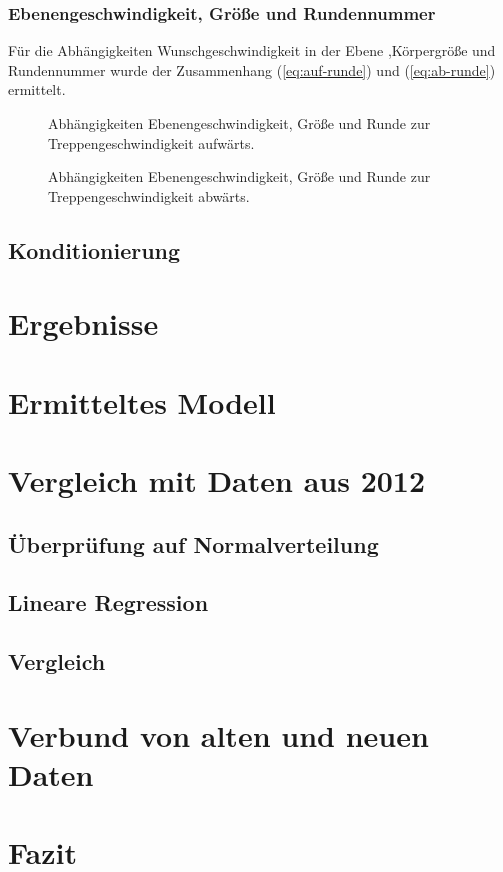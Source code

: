 \subsubsection{Ebenengeschwindigkeit, Größe und Rundennummer}

Für die Abhängigkeiten Wunschgeschwindigkeit in der Ebene ,Körpergröße und Rundennummer wurde 
der Zusammenhang (\ref{eq:auf-runde}) und (\ref{eq:ab-runde}) ermittelt.

\begin{figure} \centering 
	
	\caption{Abhängigkeiten Ebenengeschwindigkeit, Größe und Runde zur Treppengeschwindigkeit aufwärts.
	\label{fig:auf-ebene-groesse}}
\end{figure}

\begin{figure} \centering 
	
	\caption{Abhängigkeiten Ebenengeschwindigkeit, Größe und Runde zur Treppengeschwindigkeit abwärts.
	\label{fig:ab-ebene-groesse}}
\end{figure}

\subsection{Konditionierung}

\section{Ergebnisse}
\section{Ermitteltes Modell}

\section{Vergleich mit Daten aus 2012}
\subsection{Überprüfung auf Normalverteilung}
\subsection{Lineare Regression}
\subsection{Vergleich}

\section{Verbund von alten und neuen Daten}

\section{Fazit}

